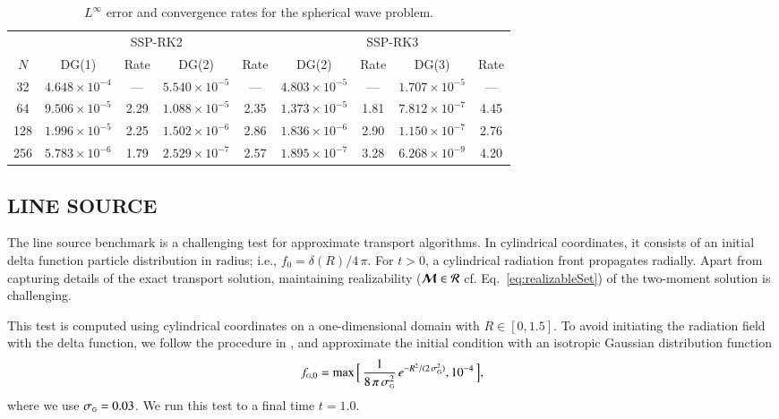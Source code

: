 \documentclass[11pt,letterpaper,twoside,english,final]{article}
\begin{document}
\begin{table}[h]
  \caption{$L^{\infty}$ error and convergence rates for the spherical wave problem.}
  \small
  \vspace{-6pt}
  \begin{center}
  \label{tab:sphericalWave}
  \begin{tabular}{ccccccccc}
    & \multicolumn{4}{c}{SSP-RK2} & \multicolumn{4}{c}{SSP-RK3} \\
    \cmidrule(r){2-5} \cmidrule(r){6-9}
    $N$ & DG(1) & Rate & DG(2) & Rate & DG(2) & Rate & DG(3) & Rate \\
    \midrule \midrule
    32   & $4.648\times10^{-4}$ & ---  & $5.540\times10^{-5}$ & ---   & $4.803\times10^{-5}$ & ---  & $1.707\times10^{-5}$ & --- \\
    64   & $9.506\times10^{-5}$ &2.29& $1.088\times10^{-5}$ &2.35& $1.373\times10^{-5}$ &1.81& $7.812\times10^{-7}$ &4.45 \\
    128 & $1.996\times10^{-5}$ &2.25& $1.502\times10^{-6}$ &2.86& $1.836\times10^{-6}$ &2.90& $1.150\times10^{-7}$ &2.76 \\
    256 & $5.783\times10^{-6}$ &1.79& $2.529\times10^{-7}$ &2.57& $1.895\times10^{-7}$ &3.28& $6.268\times10^{-9}$ &4.20 \\
    \midrule \midrule
  \end{tabular}
  \end{center}
\end{table}

\subsection{LINE SOURCE}

The line source benchmark \citep[cf.][]{brunner_2002,garrettHauck_2013} is a challenging test for approximate transport algorithms.  
In cylindrical coordinates, it consists of an initial delta function particle distribution in radius; i.e., $f_{0}=\delta(R)/4\,\pi$.  
For $t>0$, a cylindrical radiation front propagates radially.  
Apart from capturing details of the exact transport solution, maintaining realizability ($\boldsymbol{\mathcal{M}}\in\mathcal{R}$ cf. Eq.~\eqref{eq:realizableSet}) of the two-moment solution is challenging.  

This test is computed using cylindrical coordinates on a one-dimensional domain with $R\in[0,1.5]$.  
To avoid initiating the radiation field with the delta function, we follow the procedure in \citet{garrettHauck_2013}, and approximate the initial condition with an isotropic Gaussian distribution function
\begin{equation}
  f_{\mbox{\tiny G},0}
  =\max\Big[\,\frac{1}{8\,\pi\,\sigma_{\mbox{\tiny G}}^{2}}\,e^{-R^{2}/(2\,\sigma_{\mbox{\tiny G}}^{2})},10^{-4}\,\Big],
\end{equation}
where we use $\sigma_{\mbox{\tiny G}}=0.03$.  
We run this test to a final time $t=1.0$.  
\end{document}
